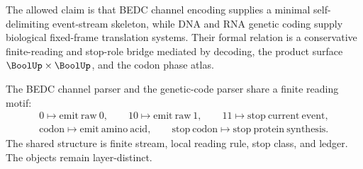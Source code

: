 \begin{corollary}
\label{cor:philosophy-channel-genetic-allowed-claim}
The allowed claim is that BEDC channel encoding supplies a minimal
self-delimiting event-stream skeleton, while DNA and RNA genetic coding
supply biological fixed-frame translation systems. Their formal
relation is a conservative finite-reading and stop-role bridge mediated
by decoding, the product surface $\BoolUp\times\BoolUp$, and the codon
phase atlas.
\end{corollary}

\begin{corollary}
\label{cor:philosophy-minimal-channel-biological-parser}
The BEDC channel parser and the genetic-code parser share a finite
reading motif:
$$
\begin{gathered}
  0\longmapsto \mathrm{emit\ raw}\ 0,\qquad
  10\longmapsto \mathrm{emit\ raw}\ 1,\qquad
  11\longmapsto \mathrm{stop\ current\ event},\\
  \mathrm{codon}\longmapsto \mathrm{emit\ amino\ acid},\qquad
  \mathrm{stop\ codon}\longmapsto \mathrm{stop\ protein\ synthesis}.
\end{gathered}
$$
The shared structure is finite stream, local reading rule, stop class,
and ledger. The objects remain layer-distinct.
\end{corollary}
